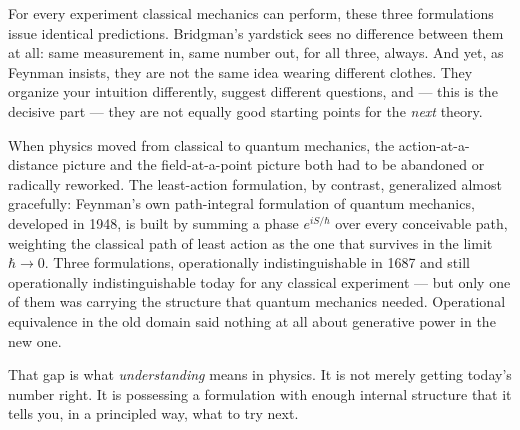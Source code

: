 For every experiment classical mechanics can perform, these three formulations
issue identical predictions. Bridgman's yardstick sees no difference between
them at all: same measurement in, same number out, for all three, always. And
yet, as Feynman insists, they are not the same idea wearing different clothes.
They organize your intuition differently, suggest different questions, and ---
this is the decisive part --- they are not equally good starting points for the
\emph{next} theory.

When physics moved from classical to quantum mechanics, the
action-at-a-distance picture and the field-at-a-point picture both had to be
abandoned or radically reworked. The least-action formulation, by contrast,
generalized almost gracefully: Feynman's own path-integral formulation of
quantum mechanics, developed in 1948, is built by summing a phase
$e^{iS/\hbar}$ over every conceivable path, weighting the classical path of
least action as the one that survives in the limit $\hbar \to 0$. Three
formulations, operationally indistinguishable in 1687 and still operationally
indistinguishable today for any classical experiment --- but only one of them
was carrying the structure that quantum mechanics needed. Operational
equivalence in the old domain said nothing at all about generative power in the
new one.

That gap is what \emph{understanding} means in physics. It is not merely
getting today's number right. It is possessing a formulation with enough
internal structure that it tells you, in a principled way, what to try next.

